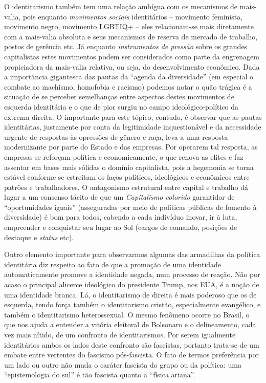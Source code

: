 O identitarismo também tem uma relação ambígua com os mecanismos de
mais-valia, pois enquanto \emph{movimentos sociais} identitários --
movimento feminista, movimento negro, movimento LGBTIQ+ -- eles
relacionam-se mais diretamente com a mais-valia absoluta e seus
mecanismos de reserva de mercado de trabalho, postos de gerência etc. Já
enquanto \emph{instrumentos de pressão} sobre os grandes capitalistas
estes movimentos podem ser considerados como parte da engrenagem
propiciadora da mais-valia relativa, ou seja, do desenvolvimento
econômico. Dada a importância gigantesca das pautas da ``agenda da
diversidade'' (em especial o combate ao machismo, homofobia e racismo)
podemos notar o quão trágica é a situação de se perceber semelhanças
entre aspectos destes movimentos de esquerda identitária e o que de pior
surgiu no campo ideológico-político da extrema direita. O importante
para este tópico, contudo, é observar que as pautas identitárias,
justamente por conta da legitimidade inquestionável e da necessidade
urgente de respostas às opressões de gênero e raça, leva a uma resposta
modernizante por parte do Estado e das empresas. Por operarem tal
resposta, as empresas se reforçam política e economicamente, o que
renova as elites e faz assentar em bases mais sólidas o domínio
capitalista, pois a hegemonia se torna estável conforme se estreitam os
laços políticos, ideológicos e econômicos entre patrões e trabalhadores.
O antagonismo estrutural entre capital e trabalho dá lugar a um consenso
tácito de que um \emph{Capitalismo colorido} garantidor de
``oportunidades iguais'' (asseguradas por meio de políticas públicas de
fomento à diversidade) é bom para todos, cabendo a cada indivíduo
inovar, ir à luta, empreender e conquistar seu lugar ao Sol (cargos de
comando, posições de destaque e \emph{status} etc).

Outro elemento importante para observarmos algumas das armadilhas da
política identitária diz respeito ao fato de que a promoção de uma
identidade automaticamente promove a identidade negada, num processo de
reação. Não por acaso o principal alicerce ideológico do presidente
Trump, nos EUA, é a noção de uma identidade branca. Lá, o identitarismo
de direita é mais poderoso que os de esquerda, tendo força também o
identitarismo cristão, especialmente evangélico, e também o
identitarismo heterossexual. O mesmo fenômeno ocorre no Brasil, o que
nos ajuda a entender a vitória eleitoral de Bolsonaro e o delineamento,
cada vez mais nítido, de um confronto de identitarismos. Por serem
igualmente identitários ambos os lados deste confronto são fascistas,
portanto trata-se de um embate entre vertentes do fascismo pós-fascista.
O fato de termos preferência por um lado ou outro não muda o caráter
fascista do grupo ou da política: uma ``epistemologia do sul'' é tão
fascista quanto a ``física ariana''.

